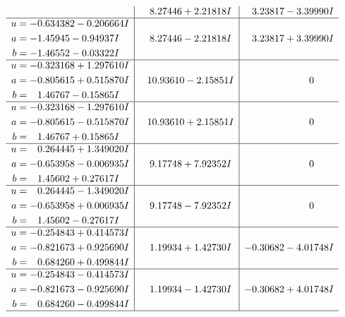 \documentclass[1p]{elsarticle_modified}
\theoremstyle{definition}
\begin{document}
$$\begin{array}{c|c|c}
 & \phantom{-}8.27446 + 2.21818 I & \phantom{-}3.23817 - 3.39990 I \\ \hline\begin{aligned}
u &= -0.634382 - 0.206664 I \\
a &= -1.45945 - 0.94937 I \\
b &= -1.46552 - 0.03322 I\end{aligned}
 & \phantom{-}8.27446 - 2.21818 I & \phantom{-}3.23817 + 3.39990 I \\ \hline\begin{aligned}
u &= -0.323168 + 1.297610 I \\
a &= -0.805615 + 0.515870 I \\
b &= \phantom{-}1.46767 - 0.15865 I\end{aligned}
 & \phantom{-}10.93610 - 2.15851 I & \phantom{-0.000000 } 0 \\ \hline\begin{aligned}
u &= -0.323168 - 1.297610 I \\
a &= -0.805615 - 0.515870 I \\
b &= \phantom{-}1.46767 + 0.15865 I\end{aligned}
 & \phantom{-}10.93610 + 2.15851 I & \phantom{-0.000000 } 0 \\ \hline\begin{aligned}
u &= \phantom{-}0.264445 + 1.349020 I \\
a &= -0.653958 - 0.006935 I \\
b &= \phantom{-}1.45602 + 0.27617 I\end{aligned}
 & \phantom{-}9.17748 + 7.92352 I & \phantom{-0.000000 } 0 \\ \hline\begin{aligned}
u &= \phantom{-}0.264445 - 1.349020 I \\
a &= -0.653958 + 0.006935 I \\
b &= \phantom{-}1.45602 - 0.27617 I\end{aligned}
 & \phantom{-}9.17748 - 7.92352 I & \phantom{-0.000000 } 0 \\ \hline\begin{aligned}
u &= -0.254843 + 0.414573 I \\
a &= -0.821673 + 0.925690 I \\
b &= \phantom{-}0.684260 + 0.499844 I\end{aligned}
 & \phantom{-}1.19934 + 1.42730 I & -0.30682 - 4.01748 I \\ \hline\begin{aligned}
u &= -0.254843 - 0.414573 I \\
a &= -0.821673 - 0.925690 I \\
b &= \phantom{-}0.684260 - 0.499844 I\end{aligned}
 & \phantom{-}1.19934 - 1.42730 I & -0.30682 + 4.01748 I\\
 \hline 
 \end{array}$$\newpage\newpage\renewcommand{\arraystretch}{1}
\end{document}
